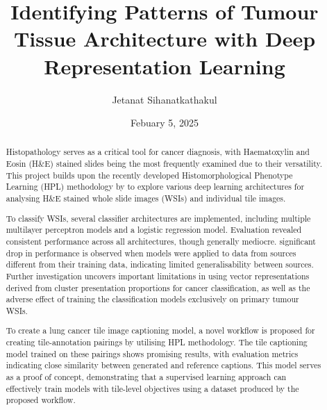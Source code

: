 \documentclass{l4proj}
\begin{document}
\title{Identifying Patterns of Tumour Tissue Architecture with Deep Representation Learning} %
\author{Jetanat Sihanatkathakul}
\date{Febuary 5, 2025}

\maketitle

\begin{abstract}
    Histopathology serves as a critical tool for cancer diagnosis, with Haematoxylin and Eosin (H\&E) stained slides being the most frequently examined due to their versatility. This project builds upon the recently developed Histomorphological Phenotype Learning (HPL) methodology by \cite{ClaudioQuiros2024} to explore various deep learning architectures for analysing H\&E stained whole slide images (WSIs) and individual tile images.
    
   To classify WSIs, several classifier architectures are implemented, including multiple multilayer perceptron models and a logistic regression model. Evaluation revealed consistent performance across all architectures, though generally mediocre. significant drop in performance is observed when models were applied to data from sources different from their training data, indicating limited generalisability between sources. Further investigation uncovers important limitations in using vector representations derived from cluster presentation proportions for cancer classification, as well as the adverse effect of training the classification models exclusively on primary tumour WSIs. 
   
   To create a lung cancer tile image captioning model, a novel workflow is proposed for creating tile-annotation pairings by utilising HPL methodology. The tile captioning model trained on these pairings shows promising results, with evaluation metrics indicating close similarity between generated and reference captions. This model serves as a proof of concept, demonstrating that a supervised learning approach can effectively train models with tile-level objectives using a dataset produced by the proposed workflow.
\end{abstract}

\end{document}

